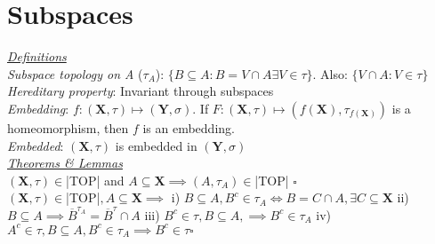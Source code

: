 \section{Subspaces}
\underline{\emph{Definitions}}\\
\emph{Subspace topology on A} ($\tau_A$): $\{B\subseteq A:B=V\cap A\exists V\in\tau\}$. Also: $\{V\cap A:V\in\tau\}$\\
\emph{Hereditary property}: Invariant through subspaces\\
\emph{Embedding}: $f:(\mathbf{X},\tau)\mapsto(\mathbf{Y},\sigma)$. If $F:(\mathbf{X},\tau)\mapsto(f(\mathbf{X}),\tau_{f(\mathbf{X})})$ is a homeomorphism, then $f$ is an embedding.\\
\emph{Embedded}: $(\mathbf{X},\tau)$ is embedded in $(\mathbf{Y},\sigma)$
\\\underline{\emph{Theorems \& Lemmas}}\\
$(\mathbf{X},\tau)\in$|TOP| and $A\subseteq \mathbf{X}\implies(A,\tau_A)\in$|TOP| $\square$\\
$(\mathbf{X},\tau)\in$|TOP|$, A\subseteq\mathbf{X}\implies$
i) $B\subseteq A,B^c\in\tau_A\iff B=C\cap A,\exists C\subseteq\mathbf{X}$
ii) $B\subseteq A\implies \overline{B}^{\tau_A}=\overline{B}^{\tau}\cap A$
iii) $B^c\in\tau,B\subseteq A,\implies B^c\in\tau_A$
iv) $A^c\in\tau,B\subseteq A,B^c\in\tau_A\implies B^c\in\tau\square$
